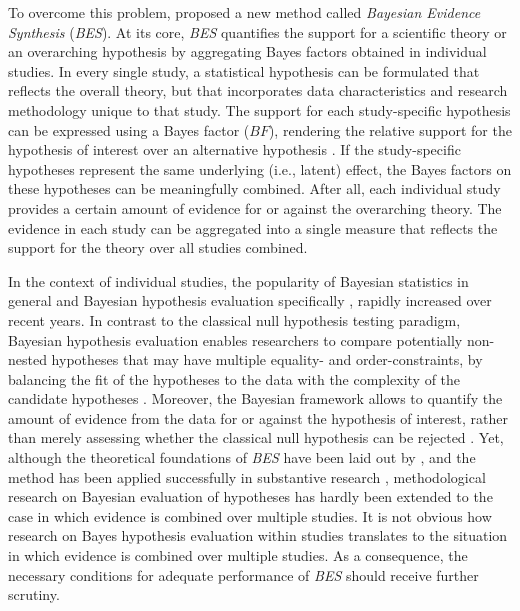 \documentclass[review, 3p, authoryear]{elsarticle} %
\begin{document}
To overcome this problem, \citet{kuiper_combining_2013} proposed a new method called \emph{Bayesian Evidence Synthesis} (\emph{BES}).
At its core, \emph{BES} quantifies the support for a scientific theory or an overarching hypothesis by aggregating Bayes factors obtained in individual studies.
In every single study, a statistical hypothesis can be formulated that reflects the overall theory, but that incorporates data characteristics and research methodology unique to that study.
The support for each study-specific hypothesis can be expressed using a Bayes factor (\(BF\)), rendering the relative support for the hypothesis of interest over an alternative hypothesis \citep{kass_raftery_bayes_factors_1995}.
If the study-specific hypotheses represent the same underlying (i.e., latent) effect, the Bayes factors on these hypotheses can be meaningfully combined.
After all, each individual study provides a certain amount of evidence for or against the overarching theory.
The evidence in each study can be aggregated into a single measure that reflects the support for the theory over all studies combined.

In the context of individual studies, the popularity of Bayesian statistics in general \citep[e.g.,][]{lynch_bayesian_2019} and Bayesian hypothesis evaluation specifically \citep{vandeschoot_systematic_2017}, rapidly increased over recent years.
In contrast to the classical null hypothesis testing paradigm, Bayesian hypothesis evaluation enables researchers to compare potentially non-nested hypotheses that may have multiple equality- and order-constraints, by balancing the fit of the hypotheses to the data with the complexity of the candidate hypotheses \citep{klugkist_inequality_2005, hoijtink2019tutorial}.
Moreover, the Bayesian framework allows to quantify the amount of evidence from the data for or against the hypothesis of interest, rather than merely assessing whether the classical null hypothesis can be rejected \citep{Wagenmakers_bayesian_2018}.
Yet, although the theoretical foundations of \emph{BES} have been laid out by \citet{kuiper_combining_2013}, and the method has been applied successfully in substantive research \citep[e.g.,][]{kevenaar_bes_2021, zondervan_parental_2019, zondervan_robust_2020, volker_cooperation_2022}, methodological research on Bayesian evaluation of hypotheses has hardly been extended to the case in which evidence is combined over multiple studies.
It is not obvious how research on Bayes hypothesis evaluation within studies translates to the situation in which evidence is combined over multiple studies.
As a consequence, the necessary conditions for adequate performance of \emph{BES} should receive further scrutiny.
\end{document}
